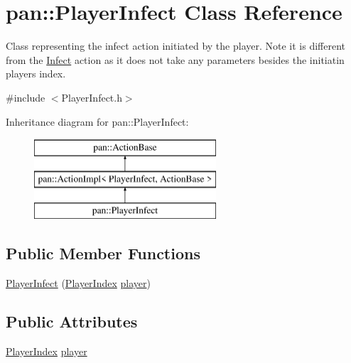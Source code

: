 \hypertarget{classpan_1_1_player_infect}{}\section{pan\+:\+:Player\+Infect Class Reference}
\label{classpan_1_1_player_infect}


Class representing the infect action initiated by the player. Note it is different from the \hyperlink{classpan_1_1_infect}{Infect} action as it does not take any parameters besides the initiatin player\textquotesingle{}s index.  




{\ttfamily \#include $<$Player\+Infect.\+h$>$}

Inheritance diagram for pan\+:\+:Player\+Infect\+:\begin{figure}[H]
\begin{center}
\leavevmode
\includegraphics[height=3.000000cm]{classpan_1_1_player_infect}
\end{center}
\end{figure}
\subsection*{Public Member Functions}
\begin{DoxyCompactItemize}
\item 
\hyperlink{classpan_1_1_player_infect_afaa2f602426d0e215d93960bc965ace1}{Player\+Infect} (\hyperlink{namespacepan_a0cdabf874fbf1bb3a1f0152d108c2909}{Player\+Index} \hyperlink{classpan_1_1_player_infect_a315aa72113a32fe97b91ada9df0ccfa6}{player})
\end{DoxyCompactItemize}
\subsection*{Public Attributes}
\begin{DoxyCompactItemize}
\item 
\hyperlink{namespacepan_a0cdabf874fbf1bb3a1f0152d108c2909}{Player\+Index} \hyperlink{classpan_1_1_player_infect_a315aa72113a32fe97b91ada9df0ccfa6}{player}
\end{DoxyCompactItemize}


